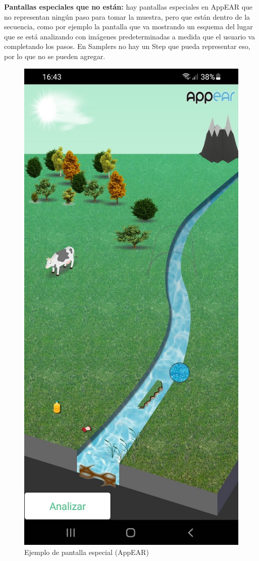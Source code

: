 \newpage

\textbf{Pantallas especiales que no están:} hay pantallas especiales en AppEAR que no representan ningún paso para tomar la muestra, pero que están dentro de la secuencia, como por ejemplo la pantalla que va mostrando un esquema del lugar que se está analizando con imágenes predeterminadas a medida que el usuario va completando los pasos. En Samplers no hay un Step que pueda representar eso, por lo que no se pueden agregar.

\begin{figure}[H]
  \centering
   \includegraphics[scale=0.3]{06-caso_de_uso/appear_esquema.jpg} 
    \caption{Ejemplo de pantalla especial (AppEAR)}
\end{figure}

